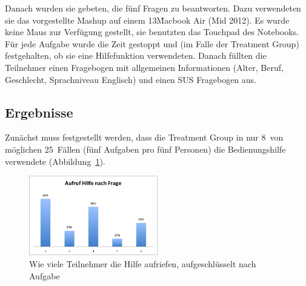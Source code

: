 \documentclass[
	headsepline,
	footsepline,
	fontsize=12pt,
	bibliography=totoc
]{scrbook}
\begin{document}
Danach wurden sie gebeten, die fünf Fragen zu beantworten. Dazu verwendeten sie das vorgestellte Mashup auf einem 13\" Macbook Air (Mid 2012). Es wurde keine Maus zur Verfügung gestellt, sie benutzten das Touchpad des Notebooks. Für jede Aufgabe wurde die Zeit gestoppt und (im Falle der Treatment Group) festgehalten, ob sie eine Hilfefunktion verwendeten. Danach füllten die Teilnehmer einen Fragebogen mit allgemeinen Informationen (Alter, Beruf, Geschlecht, Sprachniveau Englisch) und einen SUS \cite{Brooke1996} Fragebogen aus.

\subsection{Ergebnisse}


Zunächst muss festgestellt werden, dass die Treatment Group in nur 8~von möglichen 25~Fällen (fünf Aufgaben pro fünf Personen) die Bedienungshilfe verwendete (Abbildung~\ref{figure:result-helptask}). 

\begin{figure}[htbp]
   \centering
   \includegraphics[width=0.5\textwidth]{images/evaluation-result-helptask.png}
   \caption{Wie viele Teilnehmer die Hilfe aufriefen, aufgeschlüsselt nach Aufgabe}
   \label{figure:result-helptask}
\end{figure}
\end{document}
